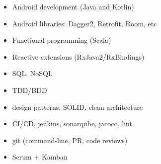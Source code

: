  \begin{multicols}{2}
    \begin{itemize}
	    \item Android development (Java and Kotlin)
	    \item Android libraries: Dagger2, Retrofit, Room, etc
	    \item Functional programming (Scala)
	    \item Reactive extensions (RxJava2/RxBindings) 
	    \item SQL, NoSQL
	    \item TDD/BDD
	    \item design patterns, SOLID, clean architecture
	    \item CI/CD, jenkins, sonarqube, jacoco, lint
	    \item git (command-line, PR, code reviews)
	    \item Scrum + Kamban
    \end{itemize}
 \end{multicols}
